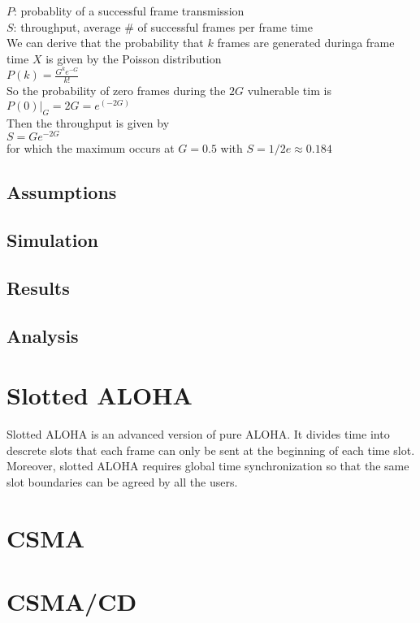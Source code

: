 \documentclass[11pt,oneside,a4paper]{report}
\begin{document}
\qquad	\(P\): probablity of a successful frame transmission \\

\qquad	\(S\): throughput, average \# of successful frames per frame time \\

We can derive that the probability that \(k\) frames are generated duringa frame time \(X\) is given by the Poisson distribution \\

\qquad	\(P(k) = \frac{G^ke^{-G}}{k!}\) \\

So the probability of zero frames during the \(2G\) vulnerable tim is \\

\qquad \(P(0)|_G=2G = e^(-2G)\) \\

Then the throughput is given by \\

\qquad \(S = Ge^{-2G}\) \\

for which the maximum occurs at \(G = 0.5\) with \(S = 1/2e \approx 0.184\) \\

\subsection*{Assumptions}

\subsection*{Simulation}

\subsection*{Results}

\subsection*{Analysis}

\section*{Slotted ALOHA}
Slotted ALOHA is an advanced version of pure ALOHA. It divides time into descrete slots that each frame can only be sent at the beginning of each time slot. Moreover, slotted ALOHA requires global time synchronization so that the same slot boundaries can be agreed by all the users.

\section*{CSMA}

\section*{CSMA/CD}
\end{document}
